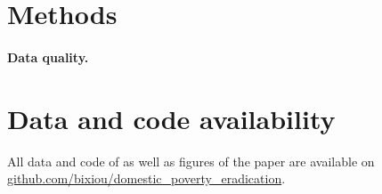   \begin{small} %
\section*{\normalsize Methods}\label{sec:methods} %
\paragraph{\small Data quality.} %


\section*{\normalsize Data and code availability}

All data and code of as well as figures of the paper are available on \href{https://github.com/bixiou/domestic_poverty_eradication}{github.com/bixiou/domestic\_poverty\_eradication}. 

\end{small}  %

\renewcommand{\url}[1]{\href{#1}{Link}} %


\appendix %
\renewcommand{\thetable}{A\arabic{table}}
\renewcommand{\thefigure}{A\arabic{figure}}
\setcounter{figure}{0}
\setcounter{table}{0}

%  

